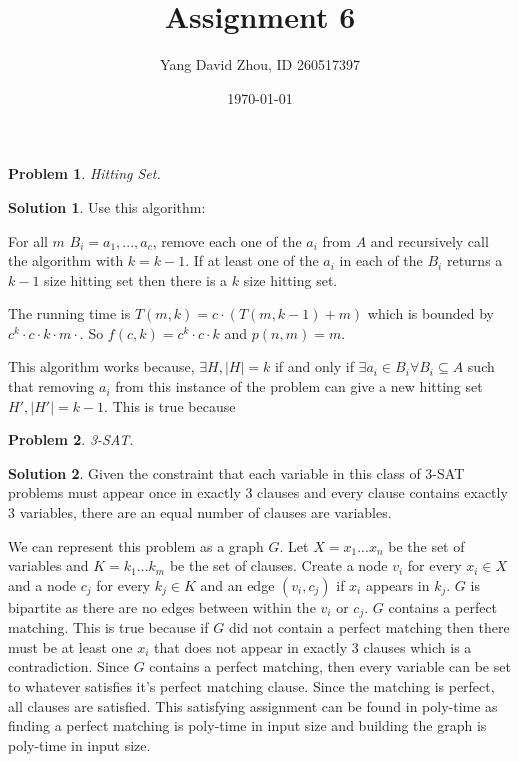 \documentclass{article}
\newtheorem{problem}{Problem}
\theoremstyle{definition}
\newtheorem*{solution}{Solution}
\begin{document}
 \title{Assignment 6} 

\author{Yang David Zhou, ID 260517397} 

\date{\today}

\maketitle

\begin{problem} 

Hitting Set.

\end{problem}

\begin{solution}

Use this algorithm:

For all \(m\) \(B_i=a_1,...,a_c\), remove each one of the \(a_i\) from \(A
\) and recursively call the algorithm with \(k=k-1\). If at least one of the \(a_i\) in each of the \(B_i\) returns a \(k-1\) size hitting set then there is a \(k\) size hitting set.

The running time is \(T(m,k)=c\cdot (T(m,k-1)+m)\) which is bounded by \(c^k\cdot c\cdot k\cdot m\cdot\). So \(f(c,k)=c^k\cdot c\cdot k\) and \(p(n,m)=m\).

This algorithm works because, \(\exists H, |H|=k \) if and only if \(\exists a_i\in B_i \forall B_i\subseteq A\) such that removing \(a_i\) from this instance of the problem can give a new hitting set \(H', |H'|=k-1\). This is true because 

\end{solution}

\begin{problem} 

3-SAT.

\end{problem}

\begin{solution}

Given the constraint that each variable in this class of 3-SAT problems must appear once in exactly 3 clauses and every clause contains exactly 3 variables, there are an equal number of clauses are variables.

We can represent this problem as a graph \(G\). Let \(X=x_1...x_n\) be the set of variables and \(K=k_1...k_m\) be the set of clauses. Create a node \(v_i\) for every \(x_i\in X\) and a node \(c_j\) for every \(k_j\in K\) and an edge \((v_i,c_j)\) if \(x_i\) appears in \(k_j\). \(G\) is bipartite as there are no edges between within the \(v_i\) or \(c_j\). \(G\) contains a perfect matching. This is true because if \(G\) did not contain a perfect matching then there must be at least one \(x_i\) that does not appear in exactly 3 clauses which is a contradiction. Since \(G\) contains a perfect matching, then every variable can be set to whatever satisfies it's perfect matching clause. Since the matching is perfect, all clauses are satisfied. This satisfying assignment can be found in poly-time as finding a perfect matching is poly-time in input size and building the graph is poly-time in input size.

\end{solution}
\end{document}
